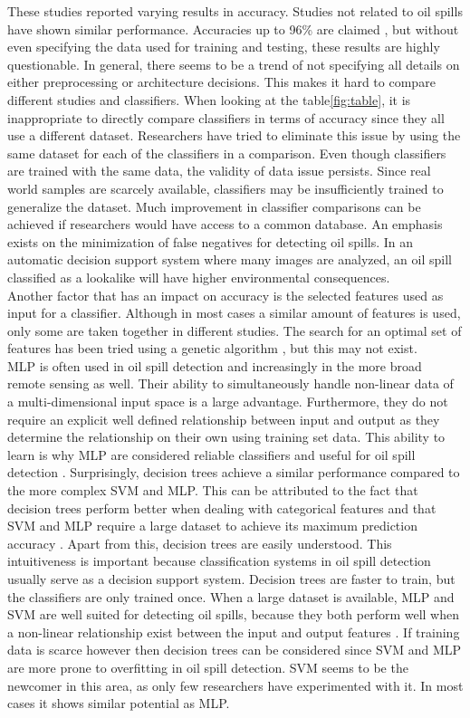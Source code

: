 These studies reported varying results in accuracy. Studies not related to oil spills have shown similar performance. Accuracies up to 96\% are claimed \cite{Topouzelis200924}, but without even specifying the data used for training and testing, these results are highly questionable. In general, there seems to be a trend of not specifying all details on either preprocessing or architecture decisions. This makes it hard to compare different studies and classifiers. When looking at the table\ref{fig:table}, it is inappropriate to directly compare classifiers in terms of accuracy since they all use a different dataset. Researchers have tried to eliminate this issue by using the same dataset for each of the classifiers in a comparison\cite{Mera201472}\cite{Xu201414}. Even though classifiers are trained with the same data, the validity of data issue persists. Since real world samples are scarcely available, classifiers may be insufficiently trained to generalize the dataset. Much improvement in classifier comparisons can be achieved if researchers would have access to a common database\cite{Topouzelis200810}. An emphasis exists on the minimization of false negatives for detecting oil spills. In an automatic decision support system where many images are analyzed, an oil spill classified as a lookalike will have higher environmental consequences.
\\
Another factor that has an impact on accuracy is the selected features used as input for a classifier. Although in most cases a similar amount of features is used, only some are taken together in different studies. The search for an optimal set of features has been tried using a genetic algorithm \cite{Topouzelis200930}, but this may not exist.
\\
MLP is often used in oil spill detection and increasingly in the more broad remote sensing as well. Their ability to simultaneously handle non-linear data of a multi-dimensional input space is a large advantage. Furthermore, they do not require an explicit well defined relationship between input and output as they determine the relationship on their own using training set data. This ability to learn is why MLP are considered reliable classifiers and useful for oil spill detection \cite{Delfrate200038}. Surprisingly, decision trees achieve a similar performance compared to the more complex SVM and MLP. This can be attributed to the fact that decision trees perform better when dealing with categorical features and that SVM and MLP require a large dataset to achieve its maximum prediction accuracy \cite{kotsiantis2007supervised}. Apart from this, decision trees are easily understood. This intuitiveness is important because classification systems in oil spill detection usually serve as a decision support system. Decision trees are faster to train, but the classifiers are only trained once. When a large dataset is available, MLP and SVM are well suited for detecting oil spills, because they both perform well when a non-linear relationship exist between the input and output features \cite{kotsiantis2007supervised}. If training data is scarce however then decision trees can be considered since SVM and MLP are more prone to overfitting in oil spill detection\cite{Xu201414}.
SVM seems to be the newcomer in this area, as only few researchers have experimented with it. In most cases it shows similar potential as MLP.